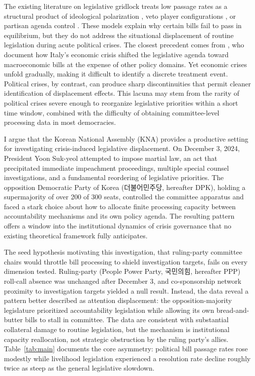 \documentclass[11pt]{article}
\begin{document}
The existing literature on legislative gridlock treats low passage rates as a structural product of ideological polarization \citep{mccarty2017}, veto player configurations \citep{tsebelis2002}, or partisan agenda control \citep{cox2005}. These models explain why certain bills fail to pass in equilibrium, but they do not address the situational displacement of routine legislation during acute political crises. The closest precedent comes from \citet{pedrazzani2018}, who document how Italy's economic crisis shifted the legislative agenda toward macroeconomic bills at the expense of other policy domains. Yet economic crises unfold gradually, making it difficult to identify a discrete treatment event. Political crises, by contrast, can produce sharp discontinuities that permit cleaner identification of displacement effects. This lacuna may stem from the rarity of political crises severe enough to reorganize legislative priorities within a short time window, combined with the difficulty of obtaining committee-level processing data in most democracies.

I argue that the Korean National Assembly (KNA) provides a productive setting for investigating crisis-induced legislative displacement. On December 3, 2024, President Yoon Suk-yeol attempted to impose martial law, an act that precipitated immediate impeachment proceedings, multiple special counsel investigations, and a fundamental reordering of legislative priorities. The opposition Democratic Party of Korea (더불어민주당, hereafter DPK), holding a supermajority of over 200 of 300 seats, controlled the committee apparatus and faced a stark choice about how to allocate finite processing capacity between accountability mechanisms and its own policy agenda. The resulting pattern offers a window into the institutional dynamics of crisis governance that no existing theoretical framework fully anticipates.

The seed hypothesis motivating this investigation, that ruling-party committee chairs would throttle bill processing to shield investigation targets, fails on every dimension tested. Ruling-party (People Power Party, 국민의힘, hereafter PPP) roll-call absence was unchanged after December 3, and co-sponsorship network proximity to investigation targets yielded a null result. Instead, the data reveal a pattern better described as attention displacement: the opposition-majority legislature prioritized accountability legislation while allowing its own bread-and-butter bills to stall in committee. The data are consistent with substantial collateral damage to routine legislation, but the mechanism is institutional capacity reallocation, not strategic obstruction by the ruling party's allies. Table~\ref{tab:main} documents the core asymmetry: political bill passage rates rose modestly while livelihood legislation experienced a resolution rate decline roughly twice as steep as the general legislative slowdown.
\end{document}
